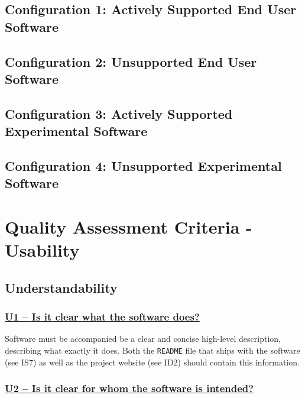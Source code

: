 \documentclass[a4paper,11pt]{article}
\newcommand{\criterion}[1]{\subsubsection*{\underline{#1}}}
\begin{document}
\subsection{Configuration 1: Actively Supported End User Software} 
\one 
\two 
\three
\four
\five
\six \seven \eight \nine \ten \eleven \twelve \thirteen \fourteen \fifteen
\nineOne \nineTwo \nineThree \nineFour \nineFive \nineSix \nineSeven \nineEight \nineNine \nineTen \nineEleven \nineTwelve \nineThirteen

\subsection{Configuration 2: Unsupported End User Software} 

\subsection{Configuration 3: Actively Supported Experimental Software} 

\subsection{Configuration 4: Unsupported Experimental Software} 





\section{Quality Assessment Criteria - Usability}\label{sec:usab}


\subsection{Understandability}\label{sec:und}

\newcommand{\uOneID}{U1}
\newcommand{\uOneText}{Is it clear what the software does?}
\criterion{\uOneID{ }--{ }\uOneText}\label{id:u1}

Software must be accompanied be a clear and concise high-level description,
describing what exactly it does. Both the \texttt{README} file that ships with
the software (see IS7) as well as the project website (see ID2) should contain
this information. 

\newcommand{\uTwoID}{U2}
\newcommand{\uTwoText}{Is it clear for whom the software is intended?}
\criterion{\uTwoID{ }--{ }\uTwoText}\label{id:u2}
\end{document}
